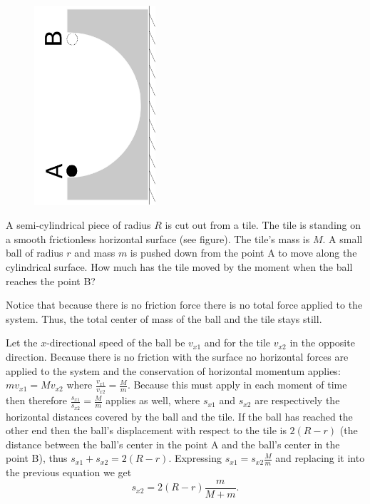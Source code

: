 \begin{figure}
	\vspace{-10pt}
	\includegraphics[angle=-90,origin=c,width=0.4\textwidth]{2016-v2g-08-halfpipe}
	\vspace{-60pt}
\end{figure}
A semi-cylindrical piece of radius $R$ is cut out from a tile. The tile is standing on a smooth frictionless horizontal surface (see figure). The tile’s mass is $M$. A small ball of radius $r$ and mass $m$ is pushed down from the point A to move along the cylindrical surface. How much has the tile moved by the moment when the ball reaches the point B?

\hinteng
Notice that because there is no friction force there is no total force applied to the system. Thus, the total center of mass of the ball and the tile stays still.

\solueng
Let the $x$-directional speed of the ball be $v_{x1}$ and for the tile $v_{x2}$ in the opposite direction. Because there is no friction with the surface no horizontal forces are applied to the system and the conservation of horizontal momentum applies: $mv_{x1}=Mv_{x2}$ where $\frac{v_{x1}}{v_{x2}}=\frac{M}{m}$. Because this must apply in each moment of time then therefore $\frac{s_{x1}}{s_{x2}}=\frac{M}{m}$ applies as well, where $s_{x1}$ and $s_{x2}$ are respectively the horizontal distances covered by the ball and the tile. If the ball has reached the other end then the ball’s displacement with respect to the tile is $2(R-r)$ (the distance between the ball’s center in the point A and the ball’s center in the point B), thus $s_{x1}+s_{x2}=2(R-r)$. Expressing $s_{x1} = s_{x2}\frac Mm$ and replacing it into the previous equation we get
$$s_{x2}=2(R-r)\frac{m}{M+m}.$$
\probend
